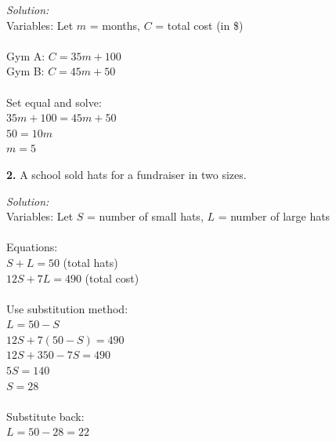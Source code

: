 \documentclass[12pt]{article}
\begin{document}
                \textit{Solution:}\\
                Variables: Let $m$ = months, $C$ = total cost (in \$)\\
                \\
                Gym A: $C = 35m + 100$\\
                Gym B: $C = 45m + 50$\\
                \\
                Set equal and solve:\\
                $35m + 100 = 45m + 50$\\
                $50 = 10m$\\
                $m = 5$


                \vspace{0.5cm}

            \textbf{2.} A school sold hats for a fundraiser in two sizes.

                \textit{Solution:}\\
                Variables: Let $S$ = number of small hats, $L$ = number of large hats\\
                \\
                Equations:\\
                $S + L = 50$ (total hats)\\
                $12S + 7L = 490$ (total cost)\\
                \\
                Use substitution method:\\
                $L = 50 - S$\\
                $12S + 7(50 - S) = 490$\\
                $12S + 350 - 7S = 490$\\
                $5S = 140$\\
                $S = 28$\\
                \\
                Substitute back:\\
                $L = 50 - 28 = 22$

\end{document}
